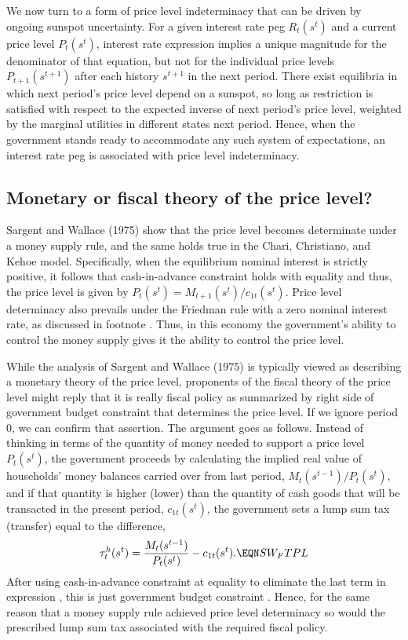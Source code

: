 We now turn to a form of  price level indeterminacy
that can be driven by ongoing sunspot uncertainty. For a given interest
rate peg $R_t(s^t)$ and a current price level $P_t(s^t)$, interest rate
expression  implies a unique magnitude for the
denominator of that equation, but not for the individual price levels
$P_{t+1}(s^{t+1})$ after each history $s^{t+1}$ in the next
period. There exist equilibria in which next period's price level depend on a sunspot, so long as restriction  is
satisfied with respect to the expected inverse of next period's
price level, weighted by the marginal utilities in different
states next period. Hence, when the government stands ready to
accommodate any such system of expectations, an interest rate peg
is associated with price level indeterminacy.



\subsection{Monetary or fiscal theory of the price level?}

Sargent and Wallace (1975) show that the price level becomes
determinate under a money supply rule, and the same holds true
in the Chari, Christiano, and Kehoe model. Specifically, when the
equilibrium nominal interest is strictly positive, it follows
that cash-in-advance constraint  holds
with equality and thus, the price level is given by
$P_t(s^t)=M_{t+1}(s^t)/c_{1t}(s^t)$.
Price level determinacy also prevails under the Friedman rule
with a zero nominal interest rate, as discussed in
footnote . Thus, in this economy the government's ability to control
 the money supply  gives it the ability to control
the price level.

While the analysis of Sargent and Wallace (1975) is typically   viewed as describing  a monetary theory
of the price level,  proponents of the fiscal theory of the price
level might reply that it is really
fiscal policy as summarized by  right side of government budget constraint
 that determines the price level.
If we ignore  period $0$, we can confirm  that assertion.
The argument goes as follows.
Instead of thinking in terms of the quantity of money needed to
support a price level $P_t(s^t)$, the government proceeds by
calculating the implied real value of households' money balances
carried over from last period, $M_t(s^{t-1})/P_t(s^t)$, and if
that quantity is higher (lower) than the quantity of cash goods
that will be transacted in the present period, $c_{1t}(s^t)$, the
government sets a lump sum tax (transfer) equal to the difference,
$$
\tau_t^h(s^t) = {M_t(s^{t-1}) \over P_t(s^t) } - c_{1t}(s^t).
                                                     \EQN SW_FTPL
$$
After using cash-in-advance constraint  at equality
to eliminate the last term in expression ,
this is just government budget constraint .
Hence, for the same reason that a money supply rule achieved price
level determinacy so would the prescribed lump sum tax associated with  the required fiscal policy.

